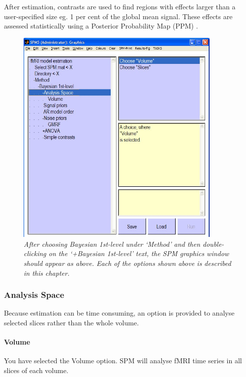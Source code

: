 After estimation, contrasts are used to find regions with effects larger than a user-specified size eg. 1 per cent of the global mean signal. These effects are assessed statistically using a Posterior Probability Map (PPM) \cite{karl_posterior}.

\begin{figure}
\begin{center}
\includegraphics[width=100mm]{fmri_est/bayes_options}
\end{center}
\caption{\em After choosing Bayesian 1st-level under `Method' and then double-clicking on the `+Bayesian 1st-level' text, the SPM graphics window should appear as above. Each of the options shown above is described in this chapter. \label{bayes_options}}
\end{figure}

\subsubsection{Analysis Space}

Because estimation can be time consuming, an option is provided to analyse selected slices rather than the whole volume.

\paragraph{Volume}

You have selected the Volume option. SPM will analyse fMRI time series in all slices of each volume.

